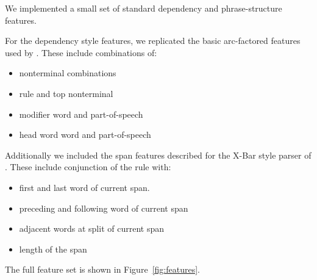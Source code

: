 \documentclass[11pt,letterpaper]{article}
\begin{document}
We implemented a small set of standard dependency and phrase-structure features.

For the dependency style features, we replicated the basic arc-factored features
used by . These include combinations of:

\begin{itemize}
\item nonterminal combinations
\item rule and top nonterminal
\item modifier word and part-of-speech
\item head word word and part-of-speech
\end{itemize}

Additionally we included the span features described for the X-Bar style
parser of . These include conjunction of the rule
with:

\begin{itemize}
\item first and last word of current span.
\item preceding and following word of current span
\item adjacent words at split of current span
\item length of the span
\end{itemize}


The full feature set  is shown in Figure~\ref{fig:features}.
\end{document}
